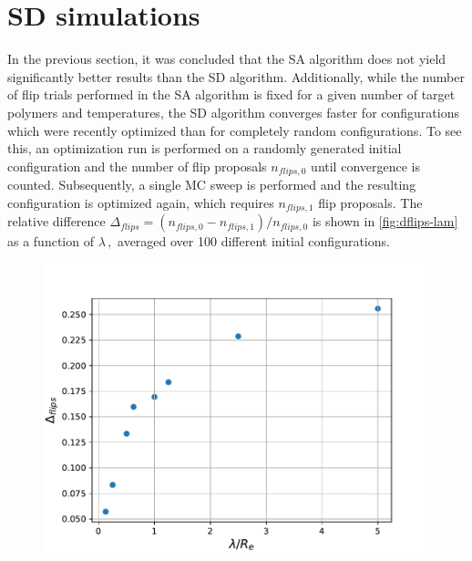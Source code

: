 \documentclass[bachelor,       %
               oneside,        %
               BCOR10mm,       %
               ngerman, english %
               ]{GAUBM}
\begin{document}
\section{SD simulations}

In the previous section, it was concluded that the \ac{SA} algorithm does not yield significantly better results than the \ac{SD} algorithm. Additionally, while the number of flip trials performed in the \ac{SA} algorithm is fixed for a given number of target polymers and temperatures, the \ac{SD} algorithm converges faster for configurations which were recently optimized than for completely random configurations. To see this, an optimization run is performed on a randomly generated initial configuration and the number of flip proposals $n_{flips,0}$ until convergence is counted. Subsequently, a single \ac{MC} sweep is performed and the resulting configuration is optimized again, which requires $n_{flips,1}$ flip proposals. The relative difference $\Delta_{flips}=(n_{flips,0}-n_{flips,1})/n_{flips,0}$ is shown in \autoref{fig:dflips-lam} as a function of $\lambda\,,$ averaged over 100 different initial configurations.


\begin{figure}[h]
    \centering
    \includegraphics[width=\textwidth]{figures/dflips-lam.pdf}
    \caption{}
    \label{fig:dflips-lam}
\end{figure}
\end{document}

